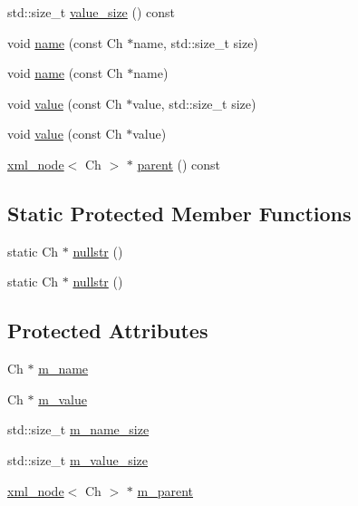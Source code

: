 \begin{DoxyCompactItemize}
std\+::size\+\_\+t \mbox{\hyperlink{classrapidxml_1_1xml__base_a2eb123d471b1567fa4832b6ee2b75493}{value\+\_\+size}} () const
\item 
void \mbox{\hyperlink{classrapidxml_1_1xml__base_ae55060ae958c6e6465d6c8db852ec6ce}{name}} (const Ch $\ast$name, std\+::size\+\_\+t size)
\item 
void \mbox{\hyperlink{classrapidxml_1_1xml__base_a4611ddc82ac83a527c65606600eb2a0d}{name}} (const Ch $\ast$name)
\item 
void \mbox{\hyperlink{classrapidxml_1_1xml__base_a3b183c2db7022a6d30494dd2f0ac11e9}{value}} (const Ch $\ast$value, std\+::size\+\_\+t size)
\item 
void \mbox{\hyperlink{classrapidxml_1_1xml__base_a81e63ec4bfd2d7ef0a6c2ed49be6e623}{value}} (const Ch $\ast$value)
\item 
\mbox{\hyperlink{classrapidxml_1_1xml__node}{xml\+\_\+node}}$<$ Ch $>$ $\ast$ \mbox{\hyperlink{classrapidxml_1_1xml__base_aa807062868d671a8c798d9d1bf016988}{parent}} () const
\end{DoxyCompactItemize}
\subsection*{Static Protected Member Functions}
\begin{DoxyCompactItemize}
\item 
static Ch $\ast$ \mbox{\hyperlink{classrapidxml_1_1xml__base_ad96ff6b1e41dab3ff60b9bc4df769a75}{nullstr}} ()
\item 
static Ch $\ast$ \mbox{\hyperlink{classrapidxml_1_1xml__base_ad96ff6b1e41dab3ff60b9bc4df769a75}{nullstr}} ()
\end{DoxyCompactItemize}
\subsection*{Protected Attributes}
\begin{DoxyCompactItemize}
\item 
Ch $\ast$ \mbox{\hyperlink{classrapidxml_1_1xml__base_ac312b54c3278ce4604a0d7866cda9360}{m\+\_\+name}}
\item 
Ch $\ast$ \mbox{\hyperlink{classrapidxml_1_1xml__base_a2747b0147e1295763ee8b5c1b29e661c}{m\+\_\+value}}
\item 
std\+::size\+\_\+t \mbox{\hyperlink{classrapidxml_1_1xml__base_a5a8c76a7274b4180213796422c4df76f}{m\+\_\+name\+\_\+size}}
\item 
std\+::size\+\_\+t \mbox{\hyperlink{classrapidxml_1_1xml__base_aa3a49d8ceddb8a8d7edb773a2226b89c}{m\+\_\+value\+\_\+size}}
\item 
\mbox{\hyperlink{classrapidxml_1_1xml__node}{xml\+\_\+node}}$<$ Ch $>$ $\ast$ \mbox{\hyperlink{classrapidxml_1_1xml__base_ab424a047cc6b30930b1eefb903c0a3dc}{m\+\_\+parent}}
\end{DoxyCompactItemize}


